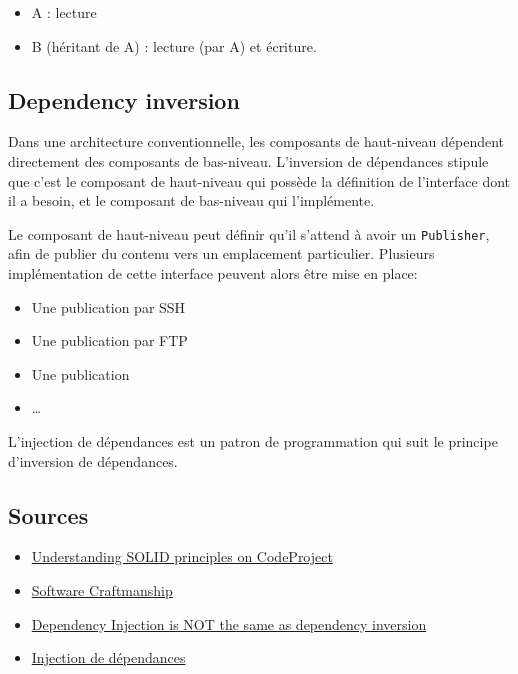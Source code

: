 \documentclass[11pt]{amsbook}
\begin{document}
\begin{itemize}

\item A : lecture

\item B (héritant de A) : lecture (par A) et écriture.

\end{itemize}


\hypertarget{x-dependency-inversion}{\subsection{Dependency inversion}}
Dans une architecture conventionnelle, les composants de haut-niveau dépendent directement des composants de bas-niveau.
L’inversion de dépendances stipule que c’est le composant de haut-niveau qui possède la définition de l’interface dont il a besoin, et le composant de bas-niveau qui l’implémente.


Le composant de haut-niveau peut définir qu’il s’attend à avoir un \texttt{Publisher}, afin de publier du contenu vers un emplacement particulier.
Plusieurs implémentation de cette interface peuvent alors être mise en place:


\begin{itemize}

\item Une publication par SSH

\item Une publication par FTP

\item Une publication

\item …​

\end{itemize}


L’injection de dépendances est un patron de programmation qui suit le principe d’inversion de dépendances.


\hypertarget{x-sources}{\subsection{Sources}}
\begin{itemize}

\item \href{http://www.codeproject.com/Articles/703634/SOLID-architecture-principles-using-simple-Csharp}{Understanding SOLID principles on CodeProject}

\item \href{http://en.wikipedia.org/wiki/Software_craftsmanship}{Software Craftmanship}

\item \href{http://lostechies.com/derickbailey/2011/09/22/dependency-injection-is-not-the-same-as-the-dependency-inversion-principle/}{Dependency Injection is NOT the same as dependency inversion}

\item \href{http://en.wikipedia.org/wiki/Dependency_injection}{Injection de dépendances}

\end{itemize}
\end{document}
